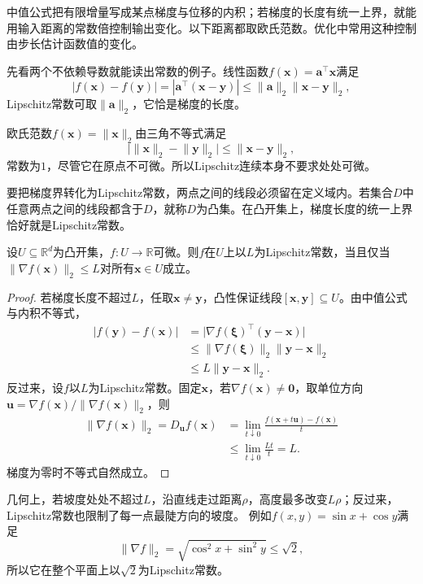 中值公式把有限增量写成某点梯度与位移的内积；若梯度的长度有统一上界，就能用输入距离的常数倍控制输出变化。以下距离都取欧氏范数。优化中常用这种控制由步长估计函数值的变化。

先看两个不依赖导数就能读出常数的例子。线性函数$f(\bm x)=\bm a^\top\bm x$满足
\[
 |f(\bm x)-f(\bm y)|=|\bm a^\top(\bm x-\bm y)|\leq\lVert\bm a\rVert_2\lVert\bm x-\bm y\rVert_2,
\]
Lipschitz常数可取$\lVert\bm a\rVert_2$，它恰是梯度的长度。

欧氏范数$f(\bm x)=\lVert\bm x\rVert_2$由三角不等式满足
\[
 \bigl|\lVert\bm x\rVert_2-\lVert\bm y\rVert_2\bigr|\leq\lVert\bm x-\bm y\rVert_2,
\]
常数为$1$，尽管它在原点不可微。所以Lipschitz连续本身不要求处处可微。

要把梯度界转化为Lipschitz常数，两点之间的线段必须留在定义域内。若集合$D$中任意两点之间的线段都含于$D$，就称$D$为凸集。在凸开集上，梯度长度的统一上界恰好就是Lipschitz常数。
\begin{theorem}[梯度有界与Lipschitz条件]
\label{thm:multivariable-gradient-lipschitz}
设$U\subseteq\mathbb R^d$为凸开集，$f:U\to\mathbb R$可微。则$f$在$U$上以$L$为Lipschitz常数，当且仅当$\lVert\nabla f(\bm x)\rVert_2\leq L$对所有$\bm x\in U$成立。
\end{theorem}
\begin{proof}
若梯度长度不超过$L$，任取$\bm x\neq\bm y$，凸性保证线段$[\bm x,\bm y]\subseteq U$。由中值公式与内积不等式，
\[
 \begin{aligned}
 |f(\bm y)-f(\bm x)|
 &=\bigl|\nabla f(\bm\xi)^\top(\bm y-\bm x)\bigr|\\
 &\leq\lVert\nabla f(\bm\xi)\rVert_2\lVert\bm y-\bm x\rVert_2\\
 &\leq L\lVert\bm y-\bm x\rVert_2.
 \end{aligned}
\]
反过来，设$f$以$L$为Lipschitz常数。固定$\bm x$，若$\nabla f(\bm x)\neq\bm0$，取单位方向$\bm u=\nabla f(\bm x)/\lVert\nabla f(\bm x)\rVert_2$，则
\[
 \begin{aligned}
 \lVert\nabla f(\bm x)\rVert_2=D_{\bm u}f(\bm x)
 &=\lim_{t\downarrow0}\frac{f(\bm x+t\bm u)-f(\bm x)}t\\
 &\leq\lim_{t\downarrow0}\frac{Lt}t=L.
 \end{aligned}
\]
梯度为零时不等式自然成立。
\end{proof}
几何上，若坡度处处不超过$L$，沿直线走过距离$\rho$，高度最多改变$L\rho$；反过来，Lipschitz常数也限制了每一点最陡方向的坡度。
例如$f(x,y)=\sin x+\cos y$满足
\[
 \lVert\nabla f\rVert_2=\sqrt{\cos^2x+\sin^2y}\leq\sqrt2,
\]
所以它在整个平面上以$\sqrt2$为Lipschitz常数。

